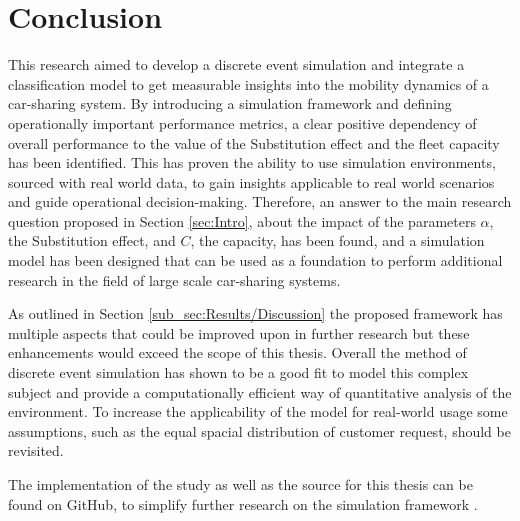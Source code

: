 \section{Conclusion}
\label{sec:Conclusion}

This research aimed to develop a discrete event simulation and integrate a classification model
to get measurable insights into the mobility dynamics of a car-sharing system. By introducing a
simulation framework and defining operationally important performance metrics, a clear
positive dependency of overall performance to the value of the Substitution effect and the
fleet capacity has been identified. This has proven the ability to use simulation environments, 
sourced with real world data, to gain insights applicable to real world scenarios and guide
operational decision-making. Therefore, an answer to the main research question proposed in Section \ref{sec:Intro},
about the impact of the parameters $\alpha$, the Substitution effect, and $C$, the capacity,
has been found, and a simulation model has been designed 
that can be used as a foundation to perform additional research in the field of large
scale car-sharing systems.

As outlined in Section \ref{sub_sec:Results/Discussion} the
proposed framework has multiple aspects that could be improved upon in further research but these
enhancements would
exceed the scope of this thesis. Overall the method of discrete event simulation has shown to be a
good fit to model this complex subject and provide a computationally efficient way of
quantitative analysis of the environment. To increase the applicability of the model for real-world
usage some assumptions, such as the equal spacial distribution of customer request, should be
revisited.

The implementation of the study as well as the source for this thesis can be found on GitHub, to 
simplify further research on the simulation framework .